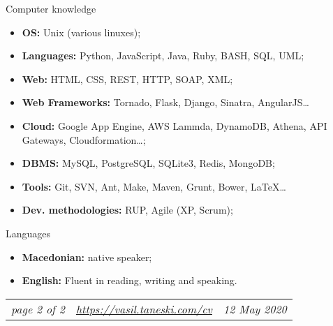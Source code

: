 \documentclass[]{mcdowellcv}
\begin{document}
    \begin{cvsection}{Computer knowledge}
    \label{Computer knowledge}
        \begin{cvsubsection}{}{}{}
            \begin{itemize}
                \item \textbf{OS:} Unix (various linuxes);
                \item \textbf{Languages:} Python, JavaScript, Java, Ruby, BASH, SQL, UML;
                \vspace{1mm}
                \item \textbf{Web:} HTML, CSS, REST, HTTP, SOAP, XML;
                \item \textbf{Web Frameworks:} Tornado, Flask, Django, Sinatra, AngularJS\ldots
                \vspace{1mm}
                \item \textbf{Cloud:} Google App Engine, AWS Lammda, DynamoDB, Athena, API Gateways, Cloudformation\ldots;
                \vspace{1mm}
                \item \textbf{DBMS:} MySQL, PostgreSQL, SQLite3, Redis, MongoDB;
                \item \textbf{Tools:} Git, SVN, Ant, Make, Maven, Grunt, Bower, \LaTeX\ldots
                \vspace{1mm}
                \item \textbf{Dev. methodologies:} RUP, Agile (XP, Scrum);
            \end{itemize}
        \end{cvsubsection}
    \end{cvsection}
    \vspace*{20pt}

    \begin{cvsection}{Languages}
    \label{Languages}
        \begin{cvsubsection}{}{}{}
            \begin{itemize}
                \item \textbf{Macedonian:} native speaker;
                \item \textbf{English:} Fluent in reading, writing and speaking.
            \end{itemize}
        \end{cvsubsection}
    \end{cvsection}

    \vfill
    \begin{tabu} to 1\textwidth {X[l,m] X[c,m] X[r,m]}
        \textit{page 2 of 2} &
        \textit{\url{https://vasil.taneski.com/cv}} &
        \textit{12 May 2020}
    \end{tabu}
    \clearpage
\end{document}
